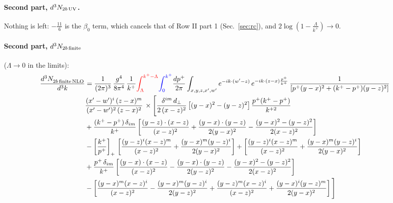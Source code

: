 \documentclass[10pt]{article}
\numberwithin{equation}{section}
\begin{document}
\paragraph{Second part, $d^3N_{2b\,\rm UV}$.} Nothing is left: $-\frac{11}{6}$ is the $\beta_0$ term, which cancels that of Row II part 1 (Sec.~\ref{sec:rc}), and $2\log(1-\frac{\Lambda}{k^+})\to0$.
\paragraph{Second part, $d^3N_{2b\,\rm finite}$} ($\Lambda\to0$ in the limits):
\begin{align}
    \frac{d^{3}N_{2b\,\rm finite\, NLO}^{\rm}}{d^{3}k} & = \frac{1}{(2\pi)^{3}}\,\frac{g^{4}}{8\pi^{4}}\,\frac{1}{k^{+}}{\color{red}\int_{\Lambda}^{k^{+}-\Lambda}}{\color{blue}\int_{0}^{k^{+}}}\frac{dp^{+}}{2\pi}\int_{x,y,z,x',w'}e^{-ik\cdot(w'-z)}\,e^{-ik\cdot(z-x)\frac{p^{+}}{k^{+}}}\,\frac{1}{\left[p^{+}(y-x)^{2}+(k^{+}-p^{+})(y-z)^{2}\right]}\notag \\ & \frac{(x'-w')^{i}\,(z-x)^{m}}{(x'-w')^{2}\,(z-x)^{2}}\,\times\Bigg[\frac{\delta^{im}\,d_{\perp}}{2\,(x-z)^{2}}\left[(y-x)^{2}-(y-z)^{2}\right]\frac{p^{+}(k^{+}-p^{+})}{k^{+2}}
\notag \\ & +\frac{(k^{+}-p^{+})\,\delta_{im}}{k^{+}}\left[\frac{(y-z)\cdot(x-z)}{(x-z)^{2}}+\frac{(y-x)\cdot(y-z)}{2(y-x)^{2}}-\frac{(y-x)^{2}-(y-z)^{2}}{2(x-z)^{2}}\right]\notag\\
&-\left[\frac{k^{+}}{p^{+}}\right]_{+}\,\left[\frac{(y-z)^{i}(x-z)^{m}}{(x-z)^{2}}+\frac{(y-x)^{m}(y-z)^{i}}{2(y-x)^{2}}\right]+\left[\frac{(y-z)^{i}(x-z)^{m}}{(x-z)^{2}}+\frac{(y-x)^{m}(y-z)^{i}}{2(y-x)^{2}}\right]\notag\\
&+\frac{p^{+}\,\delta_{im}}{k^{+}}\left[\frac{(y-x)\cdot(x-z)}{(x-z)^{2}}-\frac{(y-x)\cdot(y-z)}{2(y-z)^{2}}-\frac{(y-x)^{2}-(y-z)^{2}}{2(x-z)^{2}}\right]\notag\\
&-\left[\frac{(y-x)^{m}(x-z)^{i}}{(x-z)^{2}}-\frac{(y-x)^{m}(y-z)^{i}}{2(y-z)^{2}}+\frac{(y-z)^{m}(x-z)^{i}}{(x-z)^{2}}+\frac{(y-x)^{i}(y-z)^{m}}{2(y-x)^{2}}\right]\Bigg]\notag\\

\end{align}
\end{document}
